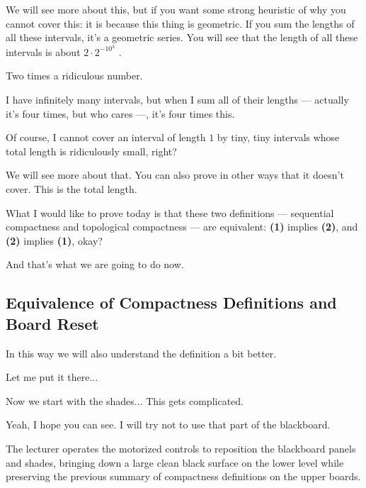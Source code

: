 \begin{speech}[01:03:58 - 01:05:35]
We will see more about this, but if you want some strong heuristic of why you cannot cover this: it is because this thing is geometric. If you sum the lengths of all these intervals, it's a geometric series. You will see that the length of all these intervals is about $2 \cdot 2^{-10^3}$ .

Two times a ridiculous number.

I have infinitely many intervals, but when I sum all of their lengths --- actually it's four times, but who cares  ---, it's four times this.

Of course, I cannot cover an interval of length $1$ by tiny, tiny intervals whose total length is ridiculously small, right?

We will see more about that.  You can also prove in other ways that it doesn't cover.  This is the total length.

What I would like to prove today is that these two definitions --- sequential compactness and topological compactness --- are equivalent: \textbf{(1)} implies \textbf{(2)}, and \textbf{(2)} implies \textbf{(1)}, okay?

And that's what we are going to do now.
\end{speech}

\subsection{Equivalence of Compactness Definitions and Board Reset}

\begin{speech}[01:05:35 - 01:06:06]
In this way we will also understand the definition a bit better. 

Let me put it there... 

Now we start with the shades... This gets complicated. 

Yeah, I hope you can see. I will try not to use that part of the blackboard.
\end{speech}

\begin{note}
The lecturer operates the motorized controls to reposition the blackboard panels and shades, bringing down a large clean black surface on the lower level while preserving the previous summary of compactness definitions on the upper boards.
\end{note}

